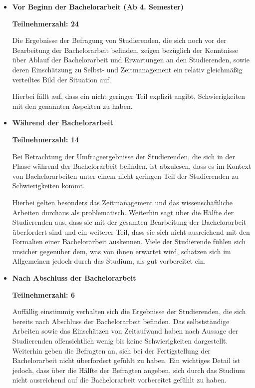 \documentclass[bibliography=totoc,listof=totoc,BCOR=5mm,DIV=12,oneside]{scrbook}
\begin{document}
\begin{itemize}
\item \textbf{Vor Beginn der Bachelorarbeit (Ab 4. Semester)}
\par \textbf{Teilnehmerzahl: 24}
\par Die Ergebnisse der Befragung von Studierenden, die sich noch vor der Bearbeitung der Bachelorarbeit befinden, zeigen bezüglich der Kenntnisse über Ablauf der Bachelorarbeit und Erwartungen an den Studierenden, sowie deren Einschätzung zu Selbst- und Zeitmanagement ein relativ gleichmäßig verteiltes Bild der Situation auf. 
\par Hierbei fällt auf, dass ein nicht geringer Teil explizit angibt, Schwierigkeiten mit den genannten Aspekten zu haben. 

\item \textbf{Während der Bachelorarbeit}
\par \textbf{Teilnehmerzahl: 14}
\par Bei Betrachtung der Umfrageergebnisse der Studierenden, die sich in der Phase während der Bachelorarbeit befinden, ist abzulesen, dass es im Kontext von Bachelorarbeiten unter einem nicht geringen Teil der Studierenden zu Schwierigkeiten kommt. 
\par Hierbei gelten besonders das Zeitmanagement und das wissenschaftliche Arbeiten durchaus als problematisch. Weiterhin sagt über die Hälfte der Studierenden aus, dass sie mit der gesamten Bearbeitung der Bachelorarbeit überfordert sind und ein weiterer Teil, dass sie sich nicht ausreichend mit den Formalien einer Bachelorarbeit auskennen. Viele der Studierende fühlen sich unsicher gegenüber dem, was von ihnen erwartet wird, schätzen sich im Allgemeinen jedoch durch das Studium, als gut vorbereitet ein.

\item \textbf{Nach Abschluss der Bachelorarbeit}
\par \textbf{Teilnehmerzahl: 6}
\par Auffällig einstimmig verhalten sich die Ergebnisse der Studierenden, die sich bereits nach Abschluss der Bachelorarbeit befinden. Das selbstständige Arbeiten sowie das Einschätzen von Zeitaufwand haben nach Aussage der Studierenden offensichtlich wenig bis keine Schwierigkeiten dargestellt. Weiterhin geben die Befragten an, sich bei der Fertigstellung der Bachelorarbeit nicht überfordert gefühlt zu haben. Ein wichtiges Detail ist jedoch, dass über die Hälfte der Befragten angeben, sich durch das Studium nicht ausreichend auf die Bachelorarbeit vorbereitet gefühlt zu haben. 
\end{itemize}
\end{document}
